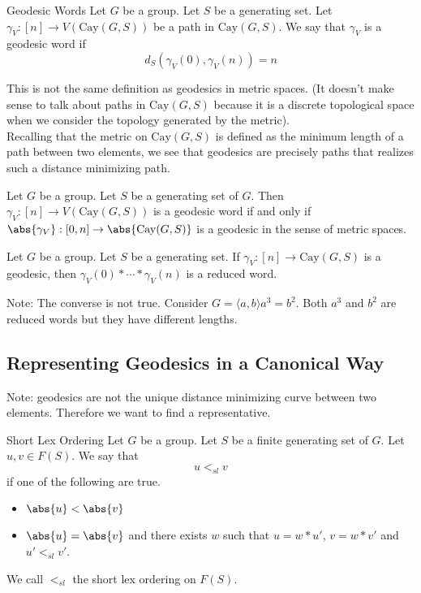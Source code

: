 \documentclass[a4paper]{article}
\begin{document}
\begin{defn}{Geodesic Words}{} Let $G$ be a group. Let $S$ be a generating set. Let $\gamma_V:[n]\to V(\text{Cay}(G,S))$ be a path in $\text{Cay}(G,S)$. We say that $\gamma_V$ is a geodesic word if $$d_S(\gamma_V(0),\gamma_V(n))=n$$
\end{defn}

This is not the same definition as geodesics in metric spaces. (It doesn't make sense to talk about paths in $\text{Cay}(G,S)$ because it is a discrete topological space when we consider the topology generated by the metric). \\

Recalling that the metric on $\text{Cay}(G,S)$ is defined as the minimum length of a path between two elements, we see that geodesics are precisely paths that realizes such a distance minimizing path. 

\begin{prp}{}{} Let $G$ be a group. Let $S$ be a generating set of $G$. Then $\gamma_V:[n]\to V(\text{Cay}(G,S))$ is a geodesic word if and only if $\abs{\gamma_V}:[0,n]\to\abs{\text{Cay}(G,S)}$ is a geodesic in the sense of metric spaces. 
\end{prp}

\begin{lmm}{}{} Let $G$ be a group. Let $S$ be a generating set. If $\gamma_V:[n]\to\text{Cay}(G,S)$ is a geodesic, then $\gamma_V(0)\ast\cdots\ast\gamma_V(n)$ is a reduced word. 
\end{lmm}

Note: The converse is not true. Consider $G=\langle a,b\rangle a^3=b^2$. Both $a^3$ and $b^2$ are reduced words but they have different lengths. \\

\subsection{Representing Geodesics in a Canonical Way}
Note: geodesics are not the unique distance minimizing curve between two elements. Therefore we want to find a representative. 

\begin{defn}{Short Lex Ordering}{} Let $G$ be a group. Let $S$ be a finite generating set of $G$. Let $u,v\in F(S)$. We say that $$u<_{sl}v$$ if one of the following are true. 
\begin{itemize}
\item $\abs{u}<\abs{v}$
\item $\abs{u}=\abs{v}$ and there exists $w$ such that $u=w\ast u'$, $v=w\ast v'$ and $u'<_{sl}v'$. 
\end{itemize}
We call $<_{sl}$ the short lex ordering on $F(S)$. 
\end{defn}
\end{document}

